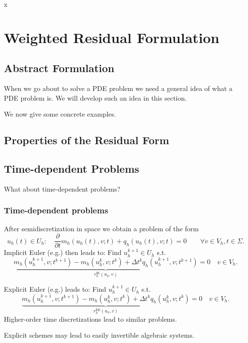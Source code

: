 x%
\section{Weighted Residual Formulation}

\subsection{Abstract Formulation}

When we go about to solve a PDE problem we need a general idea of what
a PDE problem is. We will develop such an idea in this section.


We now give some concrete examples.


\subsection{Properties of the Residual Form}


\subsection{Time-dependent Problems}

What about time-dependent problems?

\begin{frame}
\frametitle<presentation>{Time-dependent problems}
After semidiscretization in space we obtain a problem of the form
\begin{equation*}
u_h(t)\in U_h : \quad \frac{\partial}{\partial t} m_h(u_h(t),v;t) + q_h(u_h(t),v;t)
= 0 \qquad \forall v\in V_h, t\in\Sigma.
\end{equation*}
Implicit Euler (e.g.) then leads to: Find $u_h^{k+1}\in U_h$ s.t.
\begin{equation*}
\underbrace{m_h(u_h^{k+1},v;t^{k+1}) - m_h(u_h^{k},v;t^k) + \Delta
t^{k}q_h(u_h^{k+1},v;t^{k+1})}_{r_h^\text{IE}(u_h,v)}  = 0
\quad v\in V_h.
\end{equation*}

Explicit Euler (e.g.) leads to: Find  $u_h^{k+1}\in U_h$ s.t.
\begin{equation*}
\underbrace{m_h(u_h^{k+1},v;t^{k+1}) - m_h(u_h^{k},v;t^k) + \Delta
t^{k}q_h(u_h^{k},v;t^{k})}_{r_h^\text{EE}(u_h,v)}  = 0
\quad v\in V_h.
\end{equation*}
Higher-order time discretizations lead to similar problems.

Explicit schemes may lead to easily invertible algebraic systems.
\end{frame}

\cleardoublepage
